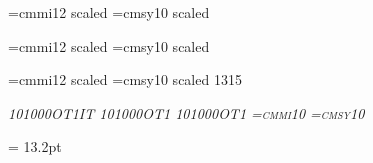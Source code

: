 {{%
\def\chapnominalsize{17pt}
\setfont\chaprm{}
\setfont\chapit{}
\setfont\chapsl{}
\setfont\chaptt{}
\setfont\chapttsl{}
\setfont\chapsf{}
\let\chapbf=\chaprm
\setfont\chapsc{}
\font\chapi=cmmi12 scaled 
\font\chapsy=cmsy10 scaled 
\def\chapecsize{1728}

\def\secnominalsize{14pt}
\setfont\secrm{}
\setfont\secrmnotbold{}
\setfont\secit{}
\setfont\secsl{}
\setfont\sectt{}
\setfont\secttsl{}
\setfont\secsf{}
\let\secbf\secrm
\setfont\secsc{}
\font\seci=cmmi12 scaled 
\font\secsy=cmsy10 scaled 
\def\sececsize{1440}

\def\ssecnominalsize{13pt}
\setfont\ssecrm{}
\setfont\ssecit{}
\setfont\ssecsl{}
\setfont\ssectt{}
\setfont\ssecttsl{}
\setfont\ssecsf{}
\let\ssecbf\ssecrm
\setfont\ssecsc{}
\font\sseci=cmmi12 scaled \magstephalf
\font\ssecsy=cmsy10 scaled 1315
\def\ssececsize{1200}

\def\reducednominalsize{10pt}
\setfont\reducedrm{}
\setfont\reducedtt{}
\setfont\reducedbf{}
\setfont\reducedit\itshape{10}{1000}{OT1IT}
\setfont\reducedsl\slshape{10}{1000}{OT1}
\setfont\reducedsf{}
\setfont\reducedsc\scshape{10}{1000}{OT1}
\setfont\reducedttsl{}
\font\reducedi=cmmi10
\font\reducedsy=cmsy10
\def\reducedecsize{1000}

\textleading = 13.2pt %
\textfonts            %
\rm
} %


%
\def\definetextfontsizex{%
\def\textnominalsize{10pt}
\edef\mainmagstep{1000}
\setfont\textrm\rmshape{10}{\mainmagstep}{OT1}
\setfont\texttt\ttshape{10}{\mainmagstep}{OT1TT}
\setfont\textbf\bfshape{10}{\mainmagstep}{OT1}
\setfont\textit\itshape{10}{\mainmagstep}{OT1IT}
\setfont\textsl\slshape{10}{\mainmagstep}{OT1}
\setfont\textsf\sfshape{10}{\mainmagstep}{OT1}
\setfont\textsc\scshape{10}{\mainmagstep}{OT1}
\setfont\textttsl\ttslshape{10}{\mainmagstep}{OT1TT}
\font\texti=cmmi10 scaled \mainmagstep
\font\textsy=cmsy10 scaled \mainmagstep
\def\textecsize{1000}

}}
